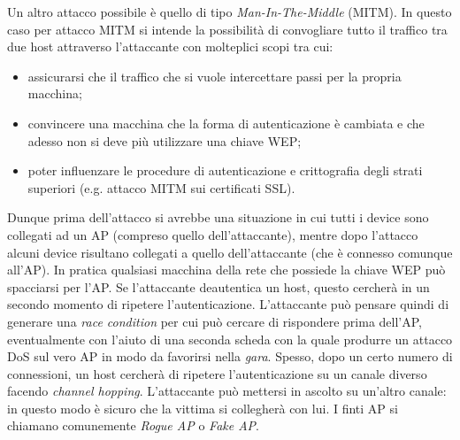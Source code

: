 Un altro attacco possibile è quello di tipo \textit{Man-In-The-Middle} (MITM). In questo caso per attacco MITM si intende la possibilità di convogliare tutto il traffico tra due host attraverso l'attaccante con molteplici scopi tra cui:
\begin{itemize}
	\item assicurarsi che il traffico che si vuole intercettare passi per la propria macchina;
	\item convincere una macchina che la forma di autenticazione è cambiata e che adesso non si deve più utilizzare una chiave WEP;
	\item poter influenzare le procedure di autenticazione e crittografia degli strati superiori (e.g. attacco MITM sui certificati SSL).
\end{itemize}
Dunque prima dell'attacco si avrebbe una situazione in cui tutti i device sono collegati ad un AP (compreso quello dell'attaccante), mentre dopo l'attacco alcuni device risultano collegati a quello dell'attaccante (che è connesso comunque all'AP). In pratica qualsiasi macchina della rete che possiede la chiave WEP può spacciarsi per l'AP. Se l'attaccante deautentica un host, questo cercherà in un secondo momento di ripetere l'autenticazione. L'attaccante può pensare quindi di generare una \textit{race condition} per cui può cercare di rispondere prima dell'AP, eventualmente con l'aiuto di una seconda scheda con la quale produrre un attacco DoS sul vero AP in modo da favorirsi nella \textit{gara}. Spesso, dopo un certo numero di connessioni, un host cercherà di ripetere l'autenticazione su un canale diverso facendo \textit{channel hopping}. L'attaccante può mettersi in ascolto su un'altro canale: in questo modo è sicuro che la vittima si collegherà con lui. I finti AP si chiamano comunemente \textit{Rogue AP} o \textit{Fake AP}.

